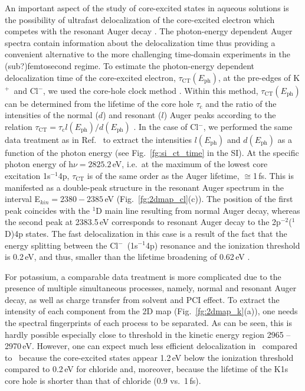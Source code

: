 {\color{red}
An important aspect of the study of core-excited states in aqueous solutions is the possibility of ultrafast delocalization of the core-excited electron which competes with the resonant Auger decay \citep{Nordlund07:217406,ottosson12:1}. The photon-energy dependent Auger spectra contain information about the delocalization time thus providing a convenient alternative to the more challenging time-domain experiments in the (sub?)femtosecond regime. To estimate the photon-energy dependent delocalization time of the core-excited electron, $\tau_{\text{CT}} (E_{\text{ph}})$, at the pre-edges of K$^{+}$~and Cl$^{-}$, we used the core-hole clock method \cite{bjorneholm92:1892,karis96:1380,wurth00:141,bruehwiler02:703,foehlisch05:373}.
Within this method, $\tau_{\text{CT}} (E_{\text{ph}})$ can be determined from the lifetime of the core hole $\tau_{\text{c}}$ and the ratio of the intensities of the normal ($d$) and resonant ($l$) Auger peaks according to the relation $\tau_{\text{CT}} = \tau_{\text{c}}l(E_{\text{ph}})/d(E_{\text{ph}})$ \citep{bjorneholm92:1892,karis96:1380,wurth00:141,bruehwiler02:703,foehlisch05:373}. In the case of Cl$^{-}$, we performed the same data treatment as in Ref.\ \cite{ceolin15:022502} to extract the intensities $l(E_{\text{ph}})$ and $d(E_{\text{ph}})$ as a function of the photon energy (see Fig.\ \ref{fg:si_ct_time} in the SI). %
At the specific photon energy of h$\nu = 2825.2$\,eV, i.e.\ at the maximum of the lowest core excitation 1s$^{-1}$4p, $\tau_{\text{CT}}$ is of the same order as the Auger lifetime, $\cong$1\,fs. This is manifested as a double-peak structure in the resonant Auger spectrum in the interval E$_{kin} = 2380 - 2385$\,eV (Fig.\ \ref{fg:2dmap_cl}(c)). The position of the first peak coincides with the $^1$D main line resulting from normal Auger decay, whereas the second peak at 2383.5\,eV corresponds to resonant Auger decay to the 2p$^{-2}$($^1$D)4p states. The fast delocalization in this case is a result of the fact that the energy splitting between the Cl$^{-}$~(1s$^{-1}$4p) resonance and the ionization threshold is 0.2\,eV, and thus, smaller than the lifetime broadening of 0.62\,eV \citep{ceolin17:263003}.


For potassium, a comparable data treatment is more complicated due to the presence of multiple simultaneous processes, namely, normal and resonant Auger decay, as well as charge transfer from solvent and PCI effect. To extract the intensity of each component from the 2D map (Fig.\ \ref{fg:2dmap_k}(a)), one needs the spectral fingerprints of each process to be separated. As can be seen, this is hardly possible especially close to threshold in the kinetic energy region 2965 -- 2970\,eV. However, one can expect much less efficient delocalization in \ki~compared to \cli~because the core-excited states appear 1.2\,eV below the ionization threshold compared to 0.2\,eV for chloride and, moreover, because the lifetime of the K1s core hole is shorter than that of chloride (0.9 vs.\ 1\,fs).}


